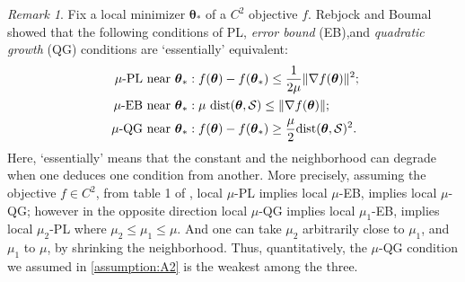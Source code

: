 \documentclass[11pt]{amsart}
\theoremstyle{plain}
\theoremstyle{definition}
\theoremstyle{remark}
\newtheorem{remark}[theorem]{Remark}
\def\v{\mathbf{v}}
\def\param{\boldsymbol{\theta}}
\newcommand{\innp}[1]{\left\langle #1 \right\rangle}
\begin{document}
\begin{remark}\label{rmk:PL}
Fix a local minimizer $\param_{*}$ of a $C^{2}$ objective $f$.  
Rebjock and Boumal \cite{rebjock2024fast} showed that the following conditions of PL, \textit{error bound} (EB),and \textit{quadratic growth} (QG) conditions are `essentially' equivalent: 
\begin{align}\label{eq:local_landscape_assumptions}
        \textup{$\mu$-PL near $\param_*$}&: \textup{$ f(\param)-f(\param_*)\leq \frac{1}{2\mu}\|\nabla f(\param)\|^2$;} \\
        \textup{$\mu$-EB near $\param_*$} &: \mu\ \textup{$\text{dist}(\param,\mathcal{S})\leq \|\nabla f(\param)\|$;} \nonumber \\
         \textup{ $\mu$-QG near $\param_*$} &: \textup{$f(\param)-f(\param_*)\geq \frac{\mu}{2}\text{dist}(\param,\mathcal{S})^2$}.  \nonumber
    \end{align}
    Here, `essentially' means that the constant and the neighborhood can degrade when one deduces one condition from another. {More precisely, assuming the objective $f\in C^2$, from table 1 of \cite{rebjock2024fast}, local $\mu$-PL implies local $\mu$-EB, implies local $\mu$-QG; however in the opposite direction local $\mu$-QG implies local $\mu_1$-EB, implies local $\mu_2$-PL where $\mu_2\le \mu_1\le \mu$. And one can take $\mu_2$ arbitrarily close to $\mu_1$, and $\mu_1$ to $\mu$, by shrinking the neighborhood. Thus, quantitatively, the $\mu$-QG condition we assumed in \ref{assumption:A2} is the weakest among the three.}
\end{remark}
\end{document}
